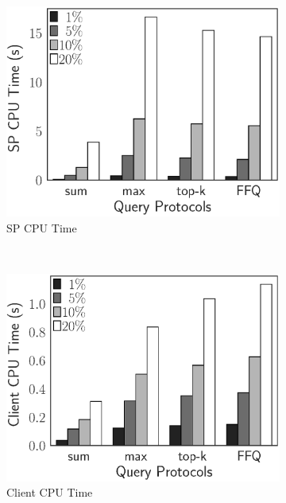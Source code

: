 \begin{figure}[t]
  \centering
  \begin{subfigure}[b]{.31\linewidth}
    \centering
    \includegraphics[width=\linewidth]{exp-figs/aggregate-queries/pgp_sp.eps}
    \caption{SP CPU Time}
  \end{subfigure}~%
  \begin{subfigure}[b]{.31\linewidth}
    \centering
    \includegraphics[width=\linewidth]{exp-figs/aggregate-queries/pgp_client.eps}
    \caption{Client CPU Time}
  \end{subfigure}~%
  \begin{subfigure}[b]{.36\linewidth}
    \centering

\end{subfigure}
\end{figure}
